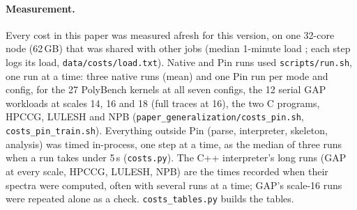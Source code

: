\documentclass[11pt]{article}
\newcommand{\fittable}[1]{\sbox{\fitbox}{}%
  \ifdim\wd\fitbox>\linewidth\resizebox{\linewidth}{!}{\usebox{\fitbox}}\else\usebox{\fitbox}\fi}
\newcommand{\memprint}{MemPrint}
\newcommand{\code}[1]{\texttt{#1}}
\begin{document}
\paragraph{Measurement.} Every cost in this paper was measured afresh for this version, on one 32-core node (62\,GB)
that was shared with other jobs (median 1-minute load \numcloadMedian; each step logs its load,
\code{data/costs/load.txt}). Native and Pin runs used \code{scripts/run.sh}, one run at a time: three native runs
(mean) and one Pin run per mode and config, for the 27 PolyBench kernels at all seven configs, the 12 serial GAP
workloads at scales 14, 16 and 18 (full traces at 16), the two C programs, HPCCG, LULESH and NPB
(\code{paper\_generalization/costs\_pin.sh}, \code{costs\_pin\_train.sh}). Everything outside Pin (parse, interpreter,
skeleton, analysis) was timed in-process, one step at a time, as the median of three runs when a run takes under
5\,s (\code{costs.py}). The C++ interpreter's long runs (GAP at every scale, HPCCG, LULESH, NPB) are the times
recorded when their spectra were computed, often with several runs at a time; GAP's scale-16 runs were repeated alone
as a check. \code{costs\_tables.py} builds the tables.

\begin{table}[!htbp]
\centering\scriptsize
\caption[Cost of every method]{Cost of every method on every program set: the native run, Pin's overhead
(instrumentation only, the sampled run that \memprint{} deploys, the full trace that gives the exact footprint), and
each static method's time, as multiples of the native run and of a full trace. PolyBench and GAP rows are medians over
their programs; the others are single programs at their largest config.}
\label{tab:costs-all}
\fittable{tables/costs_wide.tex}
\end{table}
\end{document}
